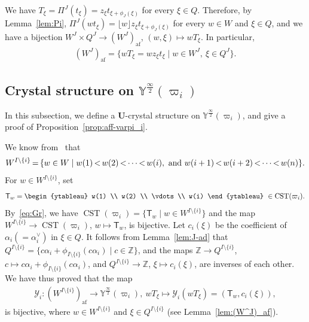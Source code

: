 \documentclass[ALCO,ThmDefs,Unicode,epreuves]{cedram}
\newcommand{\BZ}{\mathbb{Z}}
\renewcommand{\U}{\mathbf{U}}
\newcommand{\si}{\frac{\infty}{2}}
\DeclareMathOperator{\af}{af}
\DeclareMathOperator{\CST}{CST}
\newcommand*{\Mk}{\mkern -2mu}
\begin{document}
\begin{lemm} \label{lem:(W^J)_af}
We have 
$T_{\xi} = \Pi^J(t_{\xi}) = z_{\xi} t_{\xi + \phi_J(\xi)}$
for every $\xi \in Q$. 
Therefore, by Lemma~\ref{lem:Pi}, 
$\Pi^J(wt_{\xi}) = \lfloor w \rfloor z_{\xi} t_{\xi + \phi_J(\xi)}$
for every $w \in W$ and $\xi \in Q$, and we have a bijection
$W^J \times Q^J \rightarrow (W^J)_{\af}$, 
$(w,\xi) \mapsto wT_{\xi}$. 
In particular, 
\begin{align}
(W^J)_{\af} 
= 
\{ wT_{\xi} = w z_{\xi}t_{\xi} \mid w \in W^J , \ \xi \in Q^J \} .
\end{align}
\end{lemm}

\subsection{Crystal structure on \texorpdfstring{$\mathbb{Y}^{\si}(\varpi_i)$}{Y (infty/2)(varpi i)}} \label{Subsection:Y(pi_i)}

In this subsection, 
we define a $\U$-crystal structure on 
$\mathbb{Y}^{\si}(\varpi_i)$, 
and give a proof of Proposition~\ref{prop:aff-varpi_i}. 

We know from~\cite[Lemma~2.4.7]{BB}
that
\begin{align} \label{eq:Gr}
W^{I \setminus \{ i \}} 
\Mk = \Mk 
\{ w \in W \mid w(1) \Mk <\Mk w(2) \Mk < \Mk \cdots \Mk <\Mk w(i), \text{ and } w(i+1) \Mk <\Mk w(i+2) 
\Mk <\Mk \cdots \Mk < \Mk w(n) \} .
\end{align}
For 
$w \in W^{I \setminus \{ i \}}$, 
set
\begin{align}
\mathsf{T}_w = 
\begin{ytableau}
w(1) \\ w(2) \\ \vdots \\ w(i)
\end{ytableau}
\ \in 
\CST (\varpi_i) .
\end{align}
By~\eqref{eq:Gr}, 
we have 
$\CST (\varpi_i) = \{ \mathsf{T}_w \mid w \in W^{I \setminus \{ i \}} \}$ 
and the map
$W^{I \setminus \{ i \}} \rightarrow \CST (\varpi_i)$, $w \mapsto \mathsf{T}_w$, 
is bijective. 
Let 
$c_i(\xi)$ 
be the coefficient of $\alpha_i \left(= \alpha_i^{\vee}\right)$ in $\xi \in Q$. 
It follows from Lemma~\ref{lem:J-ad} that 
$Q^{I \setminus \{ i \}} = \{ c\alpha_i + \phi_{I\setminus \{ i \}}(c\alpha_i) \mid c \in \BZ \}$, 
and the maps 
$\BZ \rightarrow Q^{I \setminus \{ i \}}$, $c \mapsto c\alpha_i + \phi_{I\setminus \{ i \}}(c\alpha_i)$, 
and
$Q^{I \setminus \{ i \}} \rightarrow \BZ$, $\xi \mapsto c_i(\xi)$, 
are inverses of each other. 
We have thus proved that the map
\begin{align} \label{eq:W->Y}
\mathcal{Y}_i : 
(W^{I \setminus \{ i \}})_{\af} \rightarrow \mathbb{Y}^{\si}(\varpi_i),\ 
wT_{\xi} \mapsto 
\mathcal{Y}_i(wT_{\xi}) = 
\left( \mathsf{T}_w , c_i(\xi) \right),
\end{align}
is bijective, where 
$w \in W^{I \setminus \{ i \}}$
and 
$\xi \in Q^{I \setminus \{ i \}}$
(see Lemma~\ref{lem:(W^J)_af}).
\end{document}
